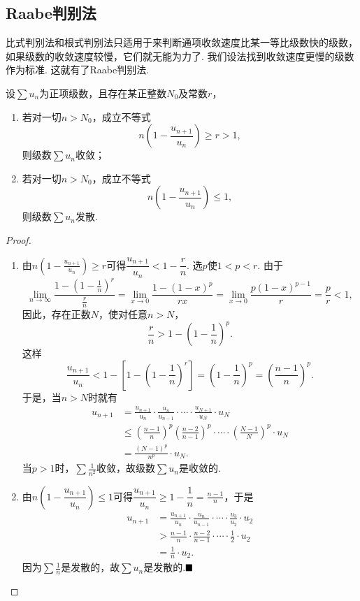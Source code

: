 \subsection{Raabe判别法}
比式判别法和根式判别法只适用于来判断通项收敛速度比某一等比级数快的级数，如果级数的收敛速度较慢，它们就无能为力了. 我们设法找到收敛速度更慢的级数作为标准. 这就有了Raabe判别法.
\begin{theorem}[Raabe判别法]
	设$\sum u_n$为正项级数，且存在某正整数$N_0$及常数$r$，
	\begin{enumerate}[(1)]
		\item 若对一切$n>N_0$，成立不等式
		$$n\left(1-\frac{u_{n+1}}{u_n}\right)\geqslant r>1,$$
		则级数$\sum u_n$收敛；
		\item 若对一切$n>N_0$，成立不等式
		$$n\left(1-\frac{u_{n+1}}{u_n}\right)\leqslant 1,$$
		则级数$\sum u_n$发散.
	\end{enumerate}
\end{theorem}
\begin{proof}
	\begin{enumerate}[(1)]
		\item 由$n\left(1-\frac{u_{n+1}}{u_n}\right)\geqslant r$可得$\dfrac{u_{n+1}}{u_n}<1-\dfrac{r}{n}$. 选$p$使$1<p<r$. 由于
		$$\lim\limits_{n\to\infty}\frac{1-\left(1-\frac{1}{n}\right)^r}{\frac{r}{n}}=\lim\limits_{x\to 0}\frac{1-(1-x)^p}{rx}=\lim\limits_{x\to 0}\frac{p(1-x)^{p-1}}{r}=\frac{p}{r}<1,$$
		因此，存在正数$N$，使对任意$n>N$，
		$$\frac{r}{n}>1-\left(1-\frac{1}{n}\right)^p.$$
		这样
		$$\frac{u_{n+1}}{u_n}<1-\left[1-\left(1-\frac{1}{n}\right)^r\right]=\left(1-\frac{1}{n}\right)^p=\left(\frac{n-1}{n}\right)^p.$$
		于是，当$n>N$时就有
		\begin{align*}
			u_{n+1}&=\frac{u_{n+1}}{u_n}\cdot\frac{u_n}{u_{n-1}}\cdot\cdots\cdot\frac{u_{N+1}}{u_N}\cdot u_N\\
			&\leqslant\left(\frac{n-1}{n}\right)^p\left(\frac{n-2}{n-1}\right)^p\cdot\cdots\cdot\left(\frac{N-1}{N}\right)^p\cdot u_N\\
			&=\frac{(N-1)^p}{n^p}\cdot u_N.
		\end{align*}
		当$p>1$时，$\sum\frac{1}{n^2}$收敛，故级数$\sum u_n$是收敛的.
		\item 由$n\left(1-\dfrac{u_{n+1}}{u_n}\right)\leqslant 1$可得$\dfrac{u_{n+1}}{u_n}\geqslant 1-\dfrac{1}{n}=\frac{n-1}{n}$，于是
		\begin{align*}
			u_{n+1}&=\frac{u_{n+1}}{u_n}\cdot\frac{u_n}{u_{n-1}}\cdot\cdots\cdot\frac{u_3}{u_2}\cdot u_2\\
			&>\frac{n-1}{n}\cdot\frac{n-2}{n-1}\cdot\cdots\cdot\frac{1}{2}\cdot u_2\\
			&=\frac{1}{n}\cdot u_2.
		\end{align*}
		因为$\sum \frac{1}{n}$是发散的，故$\sum u_n$是发散的.$\hfill\blacksquare$
	\end{enumerate}
\end{proof}
